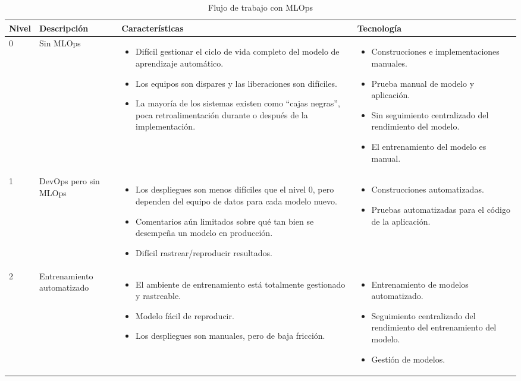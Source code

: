 \begin{longtable}{|p{2cm}|p{3cm}|p{5cm}|p{5cm}|}

\caption{Flujo de trabajo con MLOps}\\
    \hline
    \textbf{Nivel} & \textbf{Descripción} & \textbf{Características} & \textbf{Tecnología} \\
    \hline
    \endhead
        0 & Sin MLOps & \begin{itemize}\item Difícil gestionar el ciclo de vida completo del modelo de aprendizaje automático. \item Los equipos son dispares y las liberaciones son difíciles. \item La mayoría de los sistemas existen como ``cajas negras'', poca retroalimentación durante o después de la implementación.\end{itemize} & \begin{itemize}\item Construcciones e implementaciones manuales. \item Prueba manual de modelo y aplicación. \item Sin seguimiento centralizado del rendimiento del modelo. \item El entrenamiento del modelo es manual.\end{itemize} \\
        \hline
        1 & DevOps pero sin MLOps & \begin{itemize}\item Los despliegues son menos difíciles que el nivel 0, pero dependen del equipo de datos para cada modelo nuevo. \item Comentarios aún limitados sobre qué tan bien se desempeña un modelo en producción. \item Difícil rastrear/reproducir resultados.\end{itemize} & \begin{itemize}\item Construcciones automatizadas. \item Pruebas automatizadas para el código de la aplicación.\end{itemize} \\
        \hline
        2 & Entrenamiento automatizado & \begin{itemize}\item El ambiente de entrenamiento está totalmente gestionado y rastreable. \item Modelo fácil de reproducir. \item Los despliegues son manuales, pero de baja fricción.\end{itemize} & \begin{itemize}\item Entrenamiento de modelos automatizado. \item Seguimiento centralizado del rendimiento del entrenamiento del modelo. \item Gestión de modelos.\end{itemize} \\

\end{longtable}
